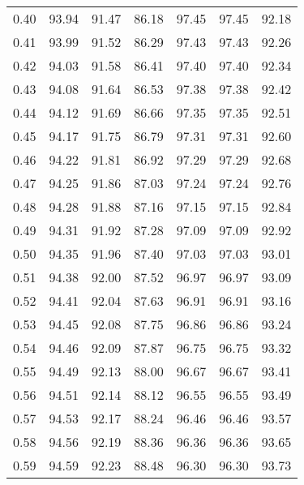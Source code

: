 \begin{tabular}{|c|c|c|c|c|c|c|}
      0.40 &     93.94 &     91.47 &      86.18 &   97.45 &      97.45 &         92.18 \\
      0.41 &     93.99 &     91.52 &      86.29 &   97.43 &      97.43 &         92.26 \\
      0.42 &     94.03 &     91.58 &      86.41 &   97.40 &      97.40 &         92.34 \\
      0.43 &     94.08 &     91.64 &      86.53 &   97.38 &      97.38 &         92.42 \\
      0.44 &     94.12 &     91.69 &      86.66 &   97.35 &      97.35 &         92.51 \\
      0.45 &     94.17 &     91.75 &      86.79 &   97.31 &      97.31 &         92.60 \\
      0.46 &     94.22 &     91.81 &      86.92 &   97.29 &      97.29 &         92.68 \\
      0.47 &     94.25 &     91.86 &      87.03 &   97.24 &      97.24 &         92.76 \\
      0.48 &     94.28 &     91.88 &      87.16 &   97.15 &      97.15 &         92.84 \\
      0.49 &     94.31 &     91.92 &      87.28 &   97.09 &      97.09 &         92.92 \\
      0.50 &     94.35 &     91.96 &      87.40 &   97.03 &      97.03 &         93.01 \\
      0.51 &     94.38 &     92.00 &      87.52 &   96.97 &      96.97 &         93.09 \\
      0.52 &     94.41 &     92.04 &      87.63 &   96.91 &      96.91 &         93.16 \\
      0.53 &     94.45 &     92.08 &      87.75 &   96.86 &      96.86 &         93.24 \\
      0.54 &     94.46 &     92.09 &      87.87 &   96.75 &      96.75 &         93.32 \\
      0.55 &     94.49 &     92.13 &      88.00 &   96.67 &      96.67 &         93.41 \\
      0.56 &     94.51 &     92.14 &      88.12 &   96.55 &      96.55 &         93.49 \\
      0.57 &     94.53 &     92.17 &      88.24 &   96.46 &      96.46 &         93.57 \\
      0.58 &     94.56 &     92.19 &      88.36 &   96.36 &      96.36 &         93.65 \\
      0.59 &     94.59 &     92.23 &      88.48 &   96.30 &      96.30 &         93.73 \\

\end{tabular}
